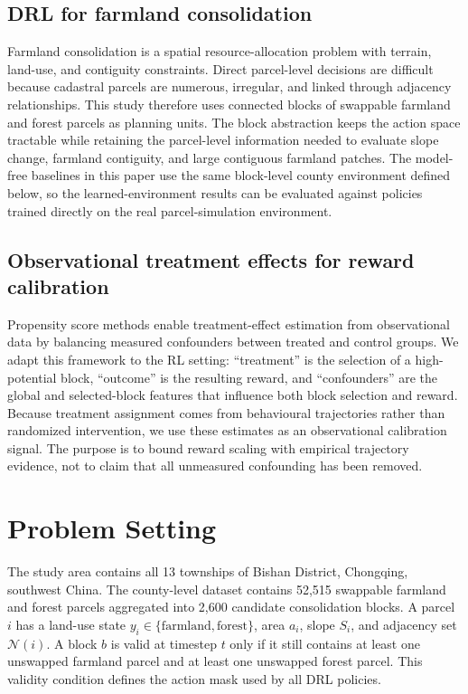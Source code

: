 \documentclass[11pt]{article}
\begin{document}
\subsection{DRL for farmland consolidation}

Farmland consolidation is a spatial resource-allocation problem with terrain, land-use, and contiguity constraints. Direct parcel-level decisions are difficult because cadastral parcels are numerous, irregular, and linked through adjacency relationships. This study therefore uses connected blocks of swappable farmland and forest parcels as planning units. The block abstraction keeps the action space tractable while retaining the parcel-level information needed to evaluate slope change, farmland contiguity, and large contiguous farmland patches. The model-free baselines in this paper use the same block-level county environment defined below, so the learned-environment results can be evaluated against policies trained directly on the real parcel-simulation environment.

\subsection{Observational treatment effects for reward calibration}

Propensity score methods \citep{stuart2010matching} enable treatment-effect estimation from observational data by balancing measured confounders between treated and control groups. We adapt this framework to the RL setting: ``treatment'' is the selection of a high-potential block, ``outcome'' is the resulting reward, and ``confounders'' are the global and selected-block features that influence both block selection and reward. Because treatment assignment comes from behavioural trajectories rather than randomized intervention, we use these estimates as an observational calibration signal. The purpose is to bound reward scaling with empirical trajectory evidence, not to claim that all unmeasured confounding has been removed.


\section{Problem Setting}
\label{sec:problem}

The study area contains all 13 townships of Bishan District, Chongqing, southwest China. The county-level dataset contains 52{,}515 swappable farmland and forest parcels aggregated into 2{,}600 candidate consolidation blocks. A parcel $i$ has a land-use state $y_i \in \{\text{farmland}, \text{forest}\}$, area $a_i$, slope $S_i$, and adjacency set $\mathcal{N}(i)$. A block $b$ is valid at timestep $t$ only if it still contains at least one unswapped farmland parcel and at least one unswapped forest parcel. This validity condition defines the action mask used by all DRL policies.
\end{document}
